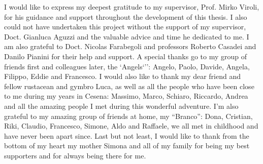 \documentclass[12pt,a4paper,openright,twoside]{book}
\begin{document}
\begin{acknowledgements} %
    I would like to express my deepest gratitude to my supervisor, Prof. Mirko Viroli, for his guidance and support throughout the development of this thesis.
    I also could not have undertaken this project without the support of my supervisor, Doct. Gianluca Aguzzi and the valuable advice and time he dedicated to me.
    I am also grateful to Doct. Nicolas Farabegoli and professors Roberto Casadei and Danilo Pianini for their help and support.
    A special thanks go to my group of friends first and colleagues later, the `Angels`'': Angelo, Paolo, Davide, Angela, Filippo, Eddie and Francesco.
    I would also like to thank my dear friend and fellow rustacean and gymbro Luca, as well as all the people who have been close to me during my years in Cesena: Massimo, Marco, Schiaro, Riccardo, Andrea and
    all the amazing people I met during this wonderful adventure.
    I'm also grateful to my amazing group of friends at home, my ``Branco'': Dona, Cristian, Riki, Claudio, Francesco, Simone, Aldo and Raffaele, we all met in childhood and have never been apart since.
    Last but not least, I would like to thank from the bottom of my heart my mother Simona and all of my family for being my best supporters and for always being there for me.
\end{acknowledgements}

\tableofcontents
\listoffigures     %
\lstlistoflistings %

\mainmatter









\backmatter

\nocite{*} %



\end{document}

